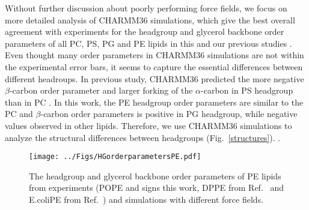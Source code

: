 \documentclass[aps,prl,superscriptaddress,twocolumn]{revtex4}
\begin{document}
Without further discussion about poorly performing force fields, we focus on more detailed analysis
of CHARMM36 simulations, which give the best overall agreement with experiments for
the headgroup and glycerol backbone order parameters of all PC, PS, PG and PE lipids in this and our previous
studies \cite{botan15,antila19}. Even thought many order parameters in CHARMM36 simulations are
not within the experimental error bars, it seems to capture the essential differences between different headroups.
In previous study, CHARMM36 predicted the more negative $\beta$-carbon order parameter and larger forking of
the $\alpha$-carbon in PS headgroup than in PC \cite{antila19}.
In this work,
the PE headgroup order parameters are similar to the PC \cite{botan15}
and $\beta$-carbon order parameters is positive in PG headgroup, while negative values observed in
other lipids. Therefore, we use CHARMM36 simulations to analyze the structural differences between
headgroups (Fig.~\ref{structures}).
.

\begin{figure}[]
  \centering
  \texttt{[image: ../Figs/HGorderparametersPE.pdf]}
  \caption{\label{HGorderParametersPE}
    The headgroup and glycerol backbone order parameters of PE lipids
    from experiments (POPE and signs this work, DPPE from Ref.~
    and E.coliPE from Ref.~) and simulations with different force fields.
  }
\end{figure}
\end{document}

